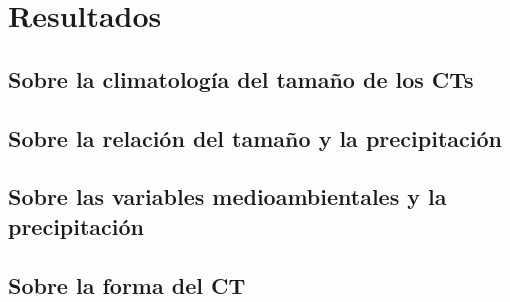 \section{Resultados}

\subsection{Sobre la climatología del tamaño de los CTs}
\subsection{Sobre la relación del tamaño y la precipitación}
\subsection{Sobre las variables medioambientales y la precipitación}
\subsection{Sobre la forma del CT}
\begin{frame}
    \par
\end{frame}